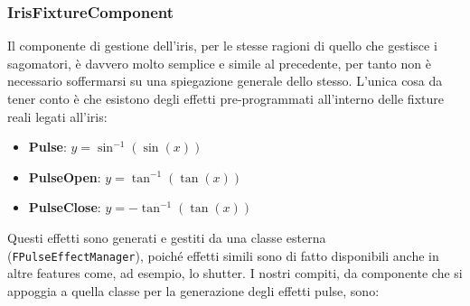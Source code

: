 \documentclass[main.tex]{subfiles}
\begin{document}
\subsubsection{IrisFixtureComponent}\label{subsec:5_1_IrisFixtureComponent}
Il componente di gestione dell'iris, per le stesse ragioni di quello che gestisce i sagomatori, è davvero molto semplice e simile al precedente, per tanto non è necessario soffermarsi su una spiegazione generale dello stesso. L'unica cosa da tener conto è che esistono degli effetti pre-programmati all'interno delle fixture reali legati all'iris:
\begin{itemize}
    \item \textbf{Pulse}: $y = \sin^{-1}(\sin(x))$
    \item \textbf{PulseOpen}: $y = \tan^{-1}(\tan(x))$
    \item \textbf{PulseClose}: $y = -\tan^{-1}(\tan(x))$
\end{itemize}
Questi effetti sono generati e gestiti da una classe esterna (\lstinline{FPulseEffectManager}), poiché effetti simili sono di fatto disponibili anche in altre features come, ad esempio, lo shutter. I nostri compiti, da componente che si appoggia a quella classe per la generazione degli effetti pulse, sono:
\end{document}
